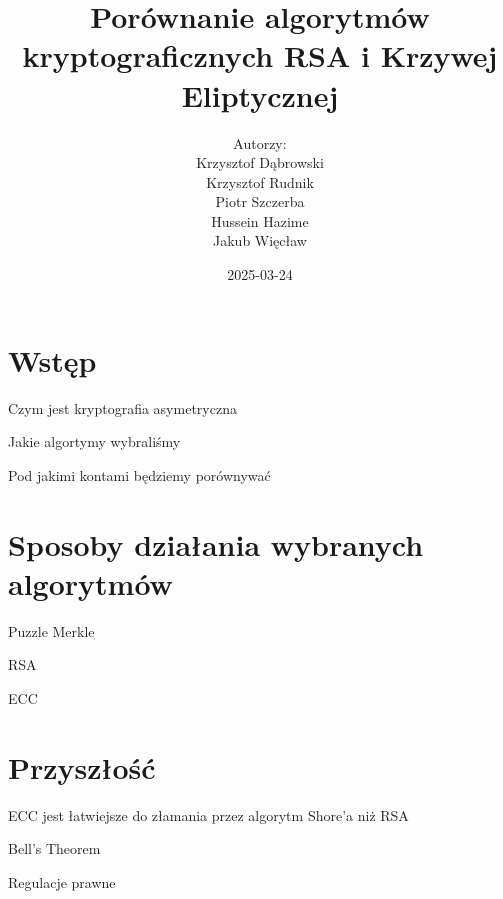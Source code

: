 \documentclass{beamer}
\title{Porównanie algorytmów kryptograficznych RSA i Krzywej Eliptycznej}
\author{Autorzy:\\ Krzysztof Dąbrowski\\ Krzysztof Rudnik\\ Piotr Szczerba\\ Hussein Hazime\\ Jakub Więcław}
\date{2025-03-24}
\begin{document}
\begin{frame}
    \titlepage
\end{frame}

\section{Wstęp}
\begin{frame}{Czym jest kryptografia asymetryczna}
\end{frame}

\begin{frame}{Jakie algortymy wybraliśmy}

\end{frame}
\begin{frame}{Pod jakimi kontami będziemy porównywać}

\end{frame}

\section{Sposoby działania wybranych algorytmów}
\begin{frame}{Puzzle Merkle} %

\end{frame}


\begin{frame}{RSA}

\end{frame}



\begin{frame}{ECC}

\end{frame}




\section{Przyszłość}
\begin{frame}{ECC jest łatwiejsze do złamania przez algorytm Shore'a niż RSA}

\end{frame}
\begin{frame}{Bell's Theorem} %

\end{frame}

\begin{frame}{Regulacje prawne}

\end{frame}
\end{document}
